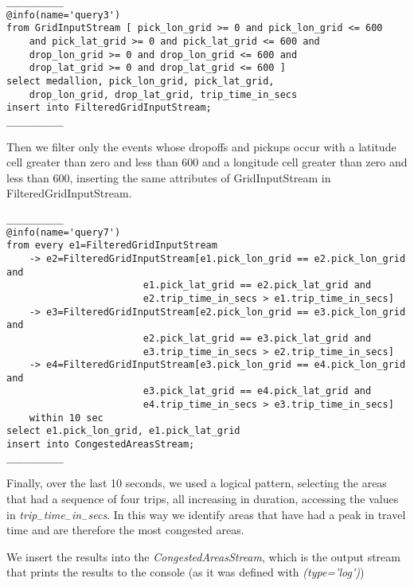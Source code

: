 \begin{lstlisting}
__________
@info(name='query3')
from GridInputStream [ pick_lon_grid >= 0 and pick_lon_grid <= 600 
	and pick_lat_grid >= 0 and pick_lat_grid <= 600 and 
	drop_lon_grid >= 0 and drop_lon_grid <= 600 and 
	drop_lat_grid >= 0 and drop_lat_grid <= 600 ]
select medallion, pick_lon_grid, pick_lat_grid, 
	drop_lon_grid, drop_lat_grid, trip_time_in_secs
insert into FilteredGridInputStream;
__________
\end{lstlisting}

Then we filter only the events whose dropoffs and pickups occur with a latitude cell greater than zero and less than 600 and a longitude cell greater than zero and less than 600, inserting the same attributes of GridInputStream in FilteredGridInputStream.\par

\begin{lstlisting}
__________
@info(name='query7')
from every e1=FilteredGridInputStream 
    -> e2=FilteredGridInputStream[e1.pick_lon_grid == e2.pick_lon_grid and 
    					e1.pick_lat_grid == e2.pick_lat_grid and 
    					e2.trip_time_in_secs > e1.trip_time_in_secs]
    -> e3=FilteredGridInputStream[e2.pick_lon_grid == e3.pick_lon_grid and 
    					e2.pick_lat_grid == e3.pick_lat_grid and 
    					e3.trip_time_in_secs > e2.trip_time_in_secs]
    -> e4=FilteredGridInputStream[e3.pick_lon_grid == e4.pick_lon_grid and 
    					e3.pick_lat_grid == e4.pick_lat_grid and 
    					e4.trip_time_in_secs > e3.trip_time_in_secs]
    within 10 sec
select e1.pick_lon_grid, e1.pick_lat_grid
insert into CongestedAreasStream;
__________
\end{lstlisting}

Finally, over the last 10 seconds, we used a logical pattern, selecting the areas that had a sequence of four trips, all increasing in duration, accessing the values in \textit{trip$_-$time$_-$in$_-$secs}. In this way we identify areas that have had a peak in travel time and are therefore the most congested areas.\par
We insert the results into the \textit{CongestedAreasStream}, which is the output stream that prints the results to the console (as it was defined with \textit{\@sink(type='log')}) 